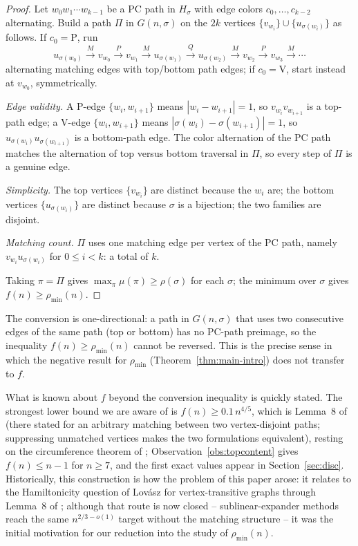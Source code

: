 \documentclass[11pt]{article}
\theoremstyle{definition}
\newcommand{\pmin}{\rho_{\min}}
\begin{document}
\begin{proof}
Let $w_0 w_1 \cdots w_{k-1}$ be a PC path in $H_\sigma$ with edge colors
$c_0,\dots,c_{k-2}$ alternating. Build a path $\Pi$ in $G(n,\sigma)$ on the $2k$
vertices $\{v_{w_i}\} \cup \{u_{\sigma(w_i)}\}$ as follows. If $c_0 = \mathrm P$, run
\[
  u_{\sigma(w_0)} \xrightarrow{M} v_{w_0} \xrightarrow{P} v_{w_1} \xrightarrow{M}
  u_{\sigma(w_1)} \xrightarrow{Q} u_{\sigma(w_2)} \xrightarrow{M} v_{w_2}
  \xrightarrow{P} v_{w_3} \xrightarrow{M} \cdots
\]
alternating matching edges with top/bottom path edges; if $c_0 = \mathrm V$, start
instead at $v_{w_0}$, symmetrically.

\emph{Edge validity.} A P-edge $\{w_i,w_{i+1}\}$ means $|w_i - w_{i+1}| = 1$, so
$v_{w_i} v_{w_{i+1}}$ is a top-path edge; a V-edge $\{w_i,w_{i+1}\}$ means
$|\sigma(w_i) - \sigma(w_{i+1})| = 1$, so $u_{\sigma(w_i)} u_{\sigma(w_{i+1})}$ is a
bottom-path edge. The color alternation of the PC path matches the alternation of top
versus bottom traversal in $\Pi$, so every step of $\Pi$ is a genuine edge.

\emph{Simplicity.} The top vertices $\{v_{w_i}\}$ are distinct because the $w_i$ are;
the bottom vertices $\{u_{\sigma(w_i)}\}$ are distinct because $\sigma$ is a bijection;
the two families are disjoint.

\emph{Matching count.} $\Pi$ uses one matching edge per vertex of the PC path, namely
$v_{w_i} u_{\sigma(w_i)}$ for $0\le i<k$: a total of $k$.

Taking $\pi=\Pi$ gives $\max_\pi\mu(\pi)\ge\rho(\sigma)$ for each $\sigma$; the
minimum over $\sigma$ gives $f(n)\ge\pmin(n)$.
\end{proof}

The conversion is one-directional: a path in $G(n,\sigma)$ that uses two consecutive
edges of the same path (top or bottom) has no PC-path preimage, so the inequality
$f(n)\ge\pmin(n)$ cannot be reversed. This is the precise sense in which the negative
result for $\pmin$ (Theorem~\ref{thm:main-intro}) does not transfer to $f$.

What is known about $f$ beyond the conversion inequality is quickly stated.
The strongest lower bound we are aware of is $f(n) \ge 0.1\, n^{4/5}$, which is
Lemma~8 of \cite{NSTW25} (there stated for an arbitrary matching between two
vertex-disjoint paths; suppressing unmatched vertices makes the two
formulations equivalent), resting on the circumference theorem of \cite{LYZ18};
Observation~\ref{obs:topcontent} gives $f(n) \le n - 1$ for $n \ge 7$, and the
first exact values appear in Section~\ref{sec:disc}. Historically, this
construction is how the problem of this paper arose: it relates to the
Hamiltonicity question of Lov\'asz \cite{Lov70} for vertex-transitive graphs
through Lemma~8 of \cite{NSTW25}; although that route is now closed --
sublinear-expander methods reach the same $n^{2/3-o(1)}$ target without the
matching structure \cite{BCPS26} -- it was the initial motivation for our
reduction into the study of $\pmin(n)$.
\end{document}
